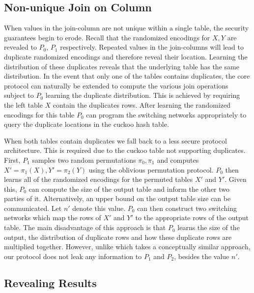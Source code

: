 \documentclass[11pt,letterpaper]{article}
\newcommand{\Party}[1]{\ensuremath{P_{#1}}\xspace}
\begin{document}
\subsection{Non-unique Join on Column}


When values in the join-column are not unique within a single table, the security guarantees begin to erode. Recall that the randomized encodings for $X,Y$ are revealed to \Party{0}, \Party{1} respectively. Repeated values in the join-columns will lead to duplicate randomized encodings and therefore reveal their location. Learning the distribution of these duplicates reveals that the underlying table has the same distribution. In the event that only one of the tables contains duplicates, the core protocol can naturally be extended to compute the various join operations subject to \Party{0} learning the duplicate distribution. This is achieved by requiring the left table $X$ contain the duplicates rows. After learning the randomized encodings for this table \Party{0} can program the switching networks appropriately to query the duplicate locations in the cuckoo hash table. 


When both tables contain duplicates we fall back to a less secure protocol architecture. This is required due to the cuckoo table not supporting duplicates. First, \Party{1} samples two random permutations $\pi_0,\pi_1$ and computes $X'=\pi_1(X),Y'=\pi_2(Y)$ using the oblivious permutation protocol. \Party{0} then learns all of the randomized encodings for the permuted tables $X'$ and $Y'$. Given this, \Party{0} can compute the size of the output table and inform the other two parties of it. Alternatively, an upper bound on the output table size can be communicated. Let $n'$ denote this value. \Party{0} can then construct two switching networks which map the rows of $X'$ and $Y'$ to the appropriate rows of the output table. The main disadvantage of this approach is that \Party{0} learns the size of the output, the distribution of duplicate rows and how these duplicate rows are multiplied together. However, unlike \cite{LTW13} which takes a conceptually similar approach, our protocol does not leak any information to \Party{1} and \Party{2}, besides the value $n'$.


\subsection{Revealing Results}
\end{document}
